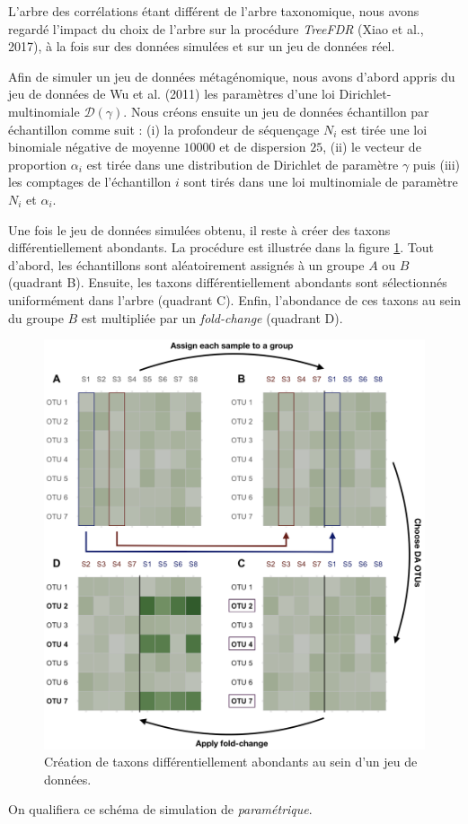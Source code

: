 \documentclass[12pt,a4paper]{reedthesis}
\theoremstyle{definition}
\theoremstyle{definition}
\theoremstyle{definition}
\theoremstyle{remark}
\begin{document}
L'arbre des corrélations étant différent de l'arbre taxonomique, nous avons regardé l'impact du choix de l'arbre sur la procédure \emph{TreeFDR} (Xiao et al., 2017), à la fois sur des données simulées et sur un jeu de données réel.

Afin de simuler un jeu de données métagénomique, nous avons d'abord appris du jeu de données de Wu et al. (2011) les paramètres d'une loi Dirichlet-multinomiale \(\mathcal{D}(\gamma)\). Nous créons ensuite un jeu de données échantillon par échantillon comme suit : (i) la profondeur de séquençage \(N_i\) est tirée une loi binomiale négative de moyenne \(10000\) et de dispersion \(25\), (ii) le vecteur de proportion \(\alpha_i\) est tirée dans une distribution de Dirichlet de paramètre \(\gamma\) puis (iii) les comptages de l'échantillon \(i\) sont tirés dans une loi multinomiale de paramètre \(N_i\) et \(\alpha_i\).

Une fois le jeu de données simulées obtenu, il reste à créer des taxons différentiellement abondants. La procédure est illustrée dans la figure \ref{fig:abdiff}. Tout d'abord, les échantillons sont aléatoirement assignés à un groupe \(A\) ou \(B\) (quadrant B). Ensuite, les taxons différentiellement abondants sont sélectionnés uniformément dans l'arbre (quadrant C). Enfin, l'abondance de ces taxons au sein du groupe \(B\) est multipliée par un \emph{fold-change} (quadrant D).


\begin{figure}[!t]

{\centering \includegraphics[width=0.9\linewidth]{img/abdiff} 

}

\caption{Création de taxons différentiellement abondants au sein d'un jeu de données.}\label{fig:abdiff}
\end{figure}
On qualifiera ce schéma de simulation de \emph{paramétrique}.
\end{document}
